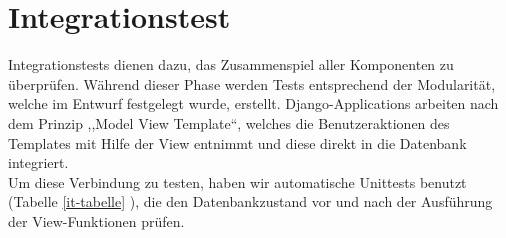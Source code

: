 \documentclass[parskip=full,11pt]{scrartcl}
\begin{document}
\begin{longtable}[c]{|p{0.4cm}|P{2.5cm}|p{3.5cm}|p{5cm}|p{3cm}|}
                  
\end{longtable}
\newpage


\section{Integrationstest} \label{integrationtest}
Integrationstests dienen dazu, das Zusammenspiel aller Komponenten zu überprüfen. Während dieser Phase werden Tests entsprechend der Modularität, welche im Entwurf festgelegt wurde, erstellt. Django-Applications arbeiten nach dem Prinzip ,,Model View Template``, welches die Benutzeraktionen des Templates mit Hilfe der View entnimmt und diese direkt in die Datenbank integriert.\\
Um diese Verbindung zu testen, haben wir automatische Unittests benutzt (Tabelle \ref{it-tabelle} ), die den Datenbankzustand vor und nach der Ausführung der View-Funktionen prüfen.\\
\end{document}
